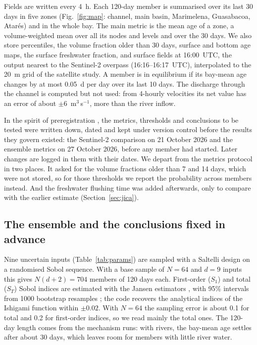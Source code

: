 \documentclass[a4paper,fleqn]{ems-dc}
\begin{document}
Fields are written every 4~h. Each 120-day member is summarised over its last 30 days in
five zones (Fig.~\ref{fig:map}: channel, main basin, Marimelena, Guasabacoa, Atar\'es) and in
the whole bay. The main metric is the mean age of a zone, a volume-weighted mean over all its
nodes and levels and over the 30 days. We also store percentiles, the volume fraction older
than 30 days, surface and bottom age maps, the surface freshwater fraction, and surface
fields at 16:00~UTC, the output nearest to the Sentinel-2 overpass (16:16--16:17~UTC),
interpolated to the 20~m grid of the satellite study. A member is in equilibrium if its
bay-mean age changes by at most 0.05~d per day over its last 10 days. The discharge through
the channel is computed but not used: from 4-hourly velocities its net value has an error of
about $\pm 6$~m$^3$\,s$^{-1}$, more than the river inflow.

In the spirit of preregistration \citep{Nosek2018}, the metrics, thresholds and conclusions to
be tested were written down, dated and kept under version control before the results they
govern existed: the Sentinel-2 comparison on
21 October 2026 and the ensemble metrics on 27 October 2026, before any member had started.
Later changes are logged in them with their dates. We depart from the metrics protocol in
two places. It asked for the volume fractions older than 7 and 14 days, which were not
stored, so for those thresholds we report the probability across members instead. And the
freshwater flushing time was added afterwards, only to compare with the earlier estimate
(Section~\ref{sec:jica}).

\subsection{The ensemble and the conclusions fixed in advance}\label{sec:ensemble}
Nine uncertain inputs (Table~\ref{tab:params}) are sampled with a Saltelli design
\citep{Saltelli2002} on a randomised Sobol sequence. With a base sample of $N = 64$ and
$d = 9$ inputs this gives $N(d+2) = 704$ members of 120 days each. First-order ($S_1$) and
total ($S_T$) Sobol indices are estimated with the Jansen estimators
\citep{Jansen1999,Saltelli2010}, with 95\% intervals from 1000 bootstrap resamples \citep{Archer1997}; the code
recovers the analytical indices of the Ishigami function \citep{Ishigami1990} within $\pm 0.02$. With $N = 64$ the
sampling error is about 0.1 for total and 0.2 for first-order indices, so we read mainly the
total ones. The 120-day length comes from the mechanism runs: with rivers, the bay-mean age
settles after about 30 days, which leaves room for members with little river water.
\end{document}
